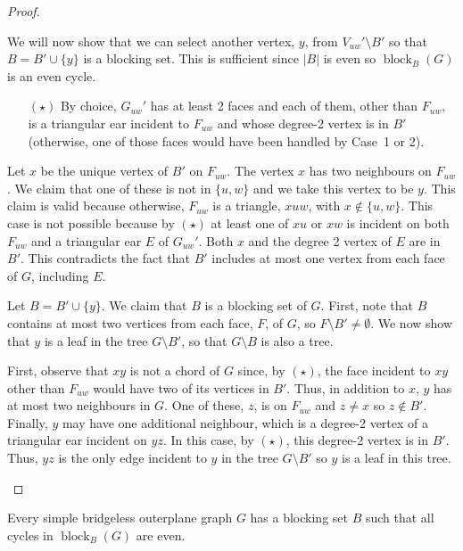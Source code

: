 \documentclass{patmorin}
\DeclareMathOperator{\block}{block}
\begin{document}
\begin{proof}
\begin{enumerate}
  We will now show that we can select another vertex, $y$, from
  $V_{uw}'\setminus B'$ so that $B=B'\cup\{y\}$ is a blocking set.
  This is sufficient since $|B|$ is even so $\block_B(G)$ is an even
  cycle.  

  \begin{itemize}
  \item[$(\star)$]
  By choice, $G_{uw}'$ has at least 2 faces and each of them, other
  than $F_{uw}$, is a triangular ear incident to $F_{uw}$ and whose
  degree-2 vertex is in $B'$ (otherwise, one of those faces would have
  been handled by Case~1 or 2).
  \end{itemize}

  Let $x$ be the unique vertex of $B'$ on $F_{uw}$. The vertex $x$ has two
  neighbours on $F_{uw}$.  We claim that one of these is not in $\{u,w\}$
  and we take this vertex to be $y$.  This claim is valid because
  otherwise, $F_{uw}$ is a triangle, $xuw$, with $x\not\in\{u,w\}$.
  This case is not possible because by $(\star)$ at least one of $xu$ or
  $xw$ is incident on both $F_{uw}$ and a triangular ear $E$ of $G_{uw}'$.
  Both $x$ and the degree 2 vertex of $E$ are in $B'$.  This contradicts
  the fact that $B'$ includes at most one vertex from each face of $G$,
  including $E$.

  Let $B=B'\cup\{y\}$.  We claim that $B$ is a blocking set of $G$.
  First, note that $B$ contains at most two vertices from each face, $F$,
  of $G$, so $F\setminus B'\neq \emptyset$.  We now show that $y$ is a
  leaf in the tree $G\setminus B'$, so that $G\setminus B$ is also a tree.

  First, observe that $xy$ is not a chord of $G$ since, by $(\star)$,
  the face incident to $xy$ other than $F_{uw}$ would have two of its
  vertices in $B'$.  Thus, in addition to $x$, $y$ has at most two
  neighbours in $G$.  One of these, $z$, is on $F_{uw}$ and $z\neq x$
  so $z\notin B'$.  Finally, $y$ may have one additional neighbour,
  which is a degree-2 vertex of a triangular ear incident on $yz$.
  In this case, by $(\star)$, this degree-2 vertex is in $B'$.  Thus,
  $yz$ is the only edge incident to $y$ in the tree $G\setminus B'$
  so $y$ is a leaf in this tree. \qedhere
\end{enumerate}
\end{proof}

\begin{lem}
  Every simple bridgeless outerplane graph $G$ has a blocking set $B$ such that
  all cycles in $\block_B(G)$ are even. 
\end{lem}
\end{document}
